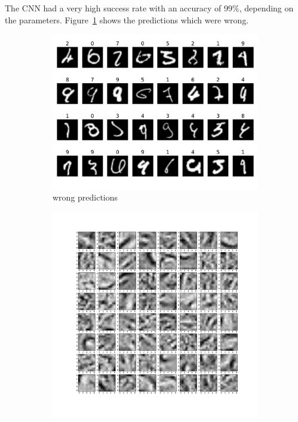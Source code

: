 \documentclass{article}
\begin{document}
\begin{enumerate}
	\begin{item}
		The CNN had a very high success rate with an accuracy of 99\%, depending on the parameters. Figure~\ref{fig:wrong_preds} shows the predictions which were wrong. 
		\begin{figure}
			\centering	
			\begin{subfigure}[b]{0.45\textwidth}
				\includegraphics[width=\textwidth]{figures/wrong_predictions}
				\caption{wrong predictions}
				\label{fig:wrong_preds}
			\end{subfigure}	
			\begin{subfigure}[b]{0.45\textwidth}
				\includegraphics[width=\textwidth]{figures/99_43}

\end{subfigure}
\end{figure}
\end{item}
\end{enumerate}
\end{document}
